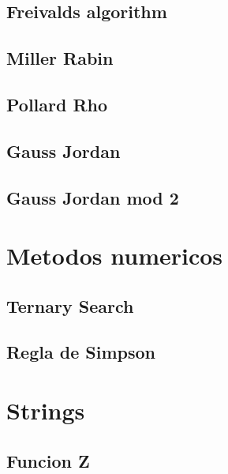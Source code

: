 \subsection{Freivalds algorithm}
\raggedbottom
\hrulefill
\subsection{Miller Rabin}
\raggedbottom
\hrulefill
\subsection{Pollard	Rho}
\raggedbottom
\hrulefill
\subsection{Gauss Jordan}
\raggedbottom
\hrulefill
\subsection{Gauss Jordan mod 2}
\raggedbottom
\hrulefill

\section{Metodos numericos}
\subsection{Ternary Search}
\raggedbottom
\hrulefill
\subsection{Regla de Simpson}
\raggedbottom
\hrulefill

\section{Strings}
\subsection{Funcion Z}
\raggedbottom
\hrulefill
